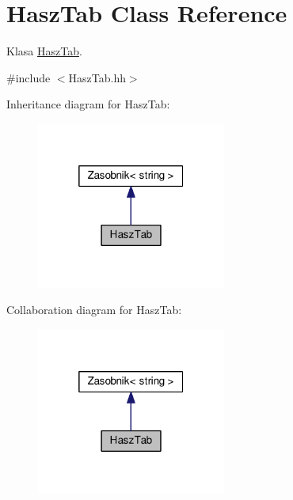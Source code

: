 \hypertarget{a00012}{}\section{Hasz\+Tab Class Reference}
\label{a00012}


Klasa \hyperlink{a00012}{Hasz\+Tab}.  




{\ttfamily \#include $<$Hasz\+Tab.\+hh$>$}



Inheritance diagram for Hasz\+Tab\+:
\nopagebreak
\begin{figure}[H]
\begin{center}
\leavevmode
\includegraphics[width=176pt]{a00148}
\end{center}
\end{figure}


Collaboration diagram for Hasz\+Tab\+:
\nopagebreak
\begin{figure}[H]
\begin{center}
\leavevmode
\includegraphics[width=176pt]{a00149}
\end{center}
\end{figure}
